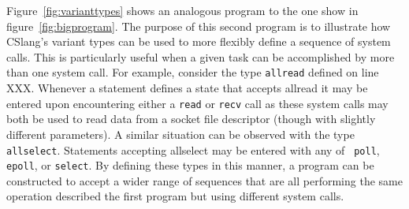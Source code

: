 Figure~\ref{fig:varianttypes} shows an analogous program to the one show in
figure~\ref{fig:bigprogram}.  The purpose of this second program is to
illustrate how CSlang's variant types can be used to more flexibly define a
sequence of system calls.  This is particularly useful when a given task
can be accomplished by more than one system call.  For example, consider
the type {\tt allread} defined on line XXX.  Whenever a statement defines a
state that accepts allread it may be entered upon encountering either a
{\tt read} or {\tt recv} call as these system calls may both be used to
read data from a socket file descriptor (though with slightly different
parameters).  A similar situation can be observed with the type {\tt
allselect}.  Statements accepting allselect may be entered with any of {\tt
poll}, {\tt epoll}, or {\tt select}.  By defining these types in this
manner, a program can be constructed to accept a wider range of sequences
that are all performing the same operation described the first program but
using different system calls.
